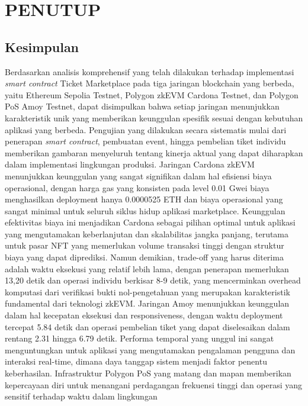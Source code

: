 \chapter{PENUTUP}
\label{chap:penutup}

\section{Kesimpulan}
\label{sec:kesimpulan}

Berdasarkan analisis komprehensif yang telah dilakukan terhadap implementasi
\emph{smart contract} Ticket Marketplace pada tiga jaringan blockchain yang
berbeda, yaitu Ethereum Sepolia Testnet, Polygon zkEVM Cardona Testnet, dan
Polygon PoS Amoy Testnet, dapat disimpulkan bahwa setiap jaringan menunjukkan
karakteristik unik yang memberikan keunggulan spesifik sesuai dengan kebutuhan
aplikasi yang berbeda. Pengujian yang dilakukan secara sistematis mulai dari
penerapan \emph{smart contract}, pembuatan event, hingga pembelian tiket
individu memberikan gambaran menyeluruh tentang kinerja aktual yang dapat
diharapkan dalam implementasi lingkungan produksi. Jaringan Cardona zkEVM
menunjukkan keunggulan yang sangat signifikan dalam hal efisiensi biaya
operasional, dengan harga gas yang konsisten pada level 0.01 Gwei biaya
menghasilkan deployment hanya 0.0000525 ETH dan biaya operasional yang sangat
minimal untuk seluruh siklus hidup aplikasi marketplace. Keunggulan efektivitas
biaya ini menjadikan Cardona sebagai pilihan optimal untuk aplikasi yang
mengutamakan keberlanjutan dan skalabilitas jangka panjang, terutama untuk
pasar NFT yang memerlukan volume transaksi tinggi dengan struktur biaya yang
dapat diprediksi. Namun demikian, trade-off yang harus diterima adalah waktu
eksekusi yang relatif lebih lama, dengan penerapan memerlukan 13,20 detik dan
operasi individu berkisar 8-9 detik, yang mencerminkan overhead komputasi dari
verifikasi bukti nol-pengetahuan yang merupakan karakteristik fundamental dari
teknologi zkEVM. Jaringan Amoy menunjukkan keunggulan dalam hal kecepatan
eksekusi dan responsiveness, dengan waktu deployment tercepat 5.84 detik dan
operasi pembelian tiket yang dapat diselesaikan dalam rentang 2.31 hingga 6.79
detik. Performa temporal yang unggul ini sangat menguntungkan untuk aplikasi
yang mengutamakan pengalaman pengguna dan interaksi real-time, dimana daya
tanggap sistem menjadi faktor penentu keberhasilan. Infrastruktur Polygon PoS
yang matang dan mapan memberikan kepercayaan diri untuk menangani perdagangan
frekuensi tinggi dan operasi yang sensitif terhadap waktu dalam lingkungan
